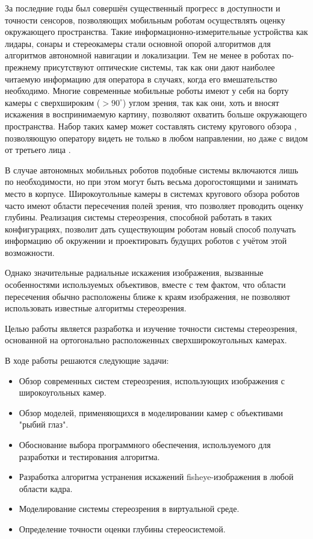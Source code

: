 За последние годы был совершён существенный прогресс в доступности и точности сенсоров, позволяющих мобильным роботам 
осуществлять оценку окружающего пространства. Такие информационно-измерительные устройства как лидары, сонары и стереокамеры
 стали основной опорой алгоритмов для алгоритмов автономной навигации и локализации. Тем не менее в роботах по-прежнему 
присутствуют оптические системы, так как они дают наиболее читаемую информацию для оператора в случаях, когда его вмешательство 
необходимо. Многие современные мобильные роботы имеют у себя на борту камеры с сверхшироким ($ > 90^\circ $)                      
углом зрения, так как они, хоть и вносят искажения в воспринимаемую картину, позволяют охватить больше окружающего пространства.               %
Набор таких камер может составлять систему кругового обзора \cite{}, позволяющую оператору видеть не только в любом направлении,                %
но даже с видом от третьего лица \cite{birdeye}. 
    
В случае автономных мобильных роботов подобные системы включаются лишь по необходимости, но при этом могут быть весьма 
дорогостоящими и занимать место в корпусе. Широкоугольные камеры в системах кругового обзора роботов часто имеют области                     %
пересечения полей зрения, что позволяет проводить оценку глубины. Реализация системы стереозрения, способной работать в таких
конфигурациях, позволит дать существующим роботам новый способ получать информацию об окружении и проектировать будущих роботов 
с учётом этой возможности. 

Однако значительные радиальные искажения изображения, вызванные особенностями используемых объективов, вместе с тем фактом, что 
области пересечения обычно расположены ближе к краям изображения, не позволяют использовать известные алгоритмы стереозрения.                                       %

Целью работы является разработка и изучение точности системы стереозрения, основанной на ортогонально расположенных сверхширокоугольных камерах.

В ходе работы решаются следующие задачи:
\begin{itemize}     %
    \item Обзор современных систем стереозрения, использующих изображения с широкоугольных камер.
    \item Обзор моделей, применяющихся в моделировании камер с объективами "рыбий глаз".
    \item Обоснование выбора программного обеспечения, используемого для разработки и тестирования алгоритма. 
    \item Разработка алгоритма устранения искажений fisheye-изображения в любой области кадра. %
    \item Моделирование системы  стереозрения в виртуальной среде.                                    
    \item Определение точности оценки глубины стереосистемой.  
\end{itemize}


\clearpage